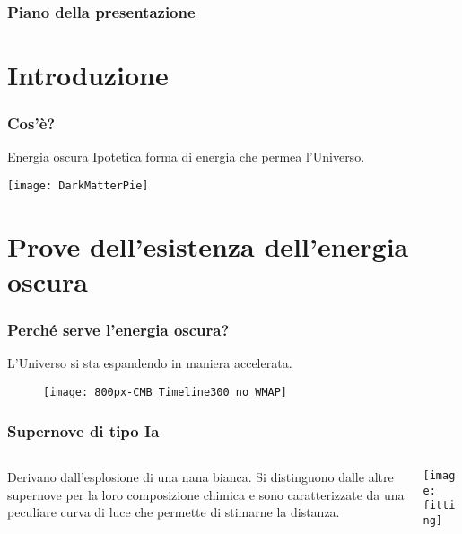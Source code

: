 \begin{frame}
  \maketitle
\end{frame}

\begin{frame}
  \frametitle{Piano della presentazione}
  \tableofcontents
\end{frame}

\section{Introduzione}

\begin{frame}
  \frametitle{Cos'è?}
  \begin{block}{Energia oscura}
    Ipotetica forma di energia che permea l'Universo.
  \end{block}
  \texttt{[image: DarkMatterPie]}
\end{frame}

\section[Prove dell'esistenza]{Prove dell'esistenza dell'energia oscura}

\begin{frame}
  \frametitle{Perché serve l'energia oscura?}
  L'Universo si sta espandendo in maniera \alert{accelerata}.
  \begin{figure}
    \centering
    \texttt{[image: 800px-CMB\_Timeline300\_no\_WMAP]}
  \end{figure}
\end{frame}

\begin{frame}
  \frametitle{Supernove di tipo Ia}
  \begin{columns}
    \begin{column}{0.35\textwidth}
      Derivano dall'esplosione di una nana bianca. Si distinguono dalle altre
      supernove per la loro composizione chimica e sono caratterizzate da una
      peculiare curva di luce che permette di stimarne la distanza.
    \end{column}
    \begin{column}{0.6\textwidth}
      \texttt{[image: fitting]}
    \end{column}
  \end{columns}
\end{frame}

